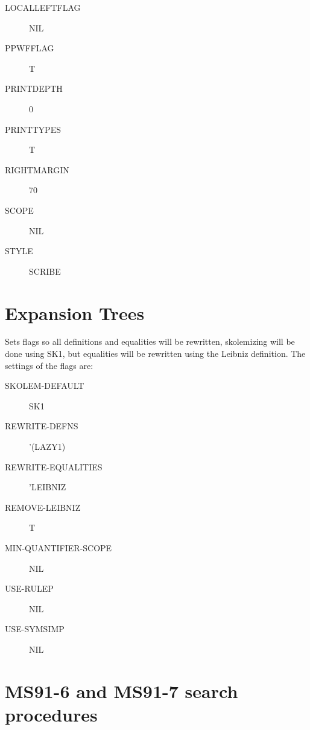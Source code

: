 \begin{description}
\begin{description}
\item[LOCALLEFTFLAG] NIL

\item[PPWFFLAG] T

\item[PRINTDEPTH] 0

\item[PRINTTYPES] T

\item[RIGHTMARGIN] 70

\item[SCOPE] NIL

\item[STYLE] SCRIBE

\end{description}

\item
\end{description}

\section{Expansion Trees}

\begin{description} 
\item[NAIVE]  
Sets flags so all definitions and equalities will be rewritten,
skolemizing will be done using SK1, but equalities will be rewritten
using the Leibniz definition. The settings of the flags are:
\begin{description}
\item[SKOLEM-DEFAULT] SK1

\item[REWRITE-DEFNS] '(LAZY1)

\item[REWRITE-EQUALITIES] 'LEIBNIZ

\item[REMOVE-LEIBNIZ] T

\item[MIN-QUANTIFIER-SCOPE] NIL

\item[USE-RULEP] NIL

\item[USE-SYMSIMP] NIL

\end{description}

\item
\end{description}

\section{MS91-6 and MS91-7 search procedures}

